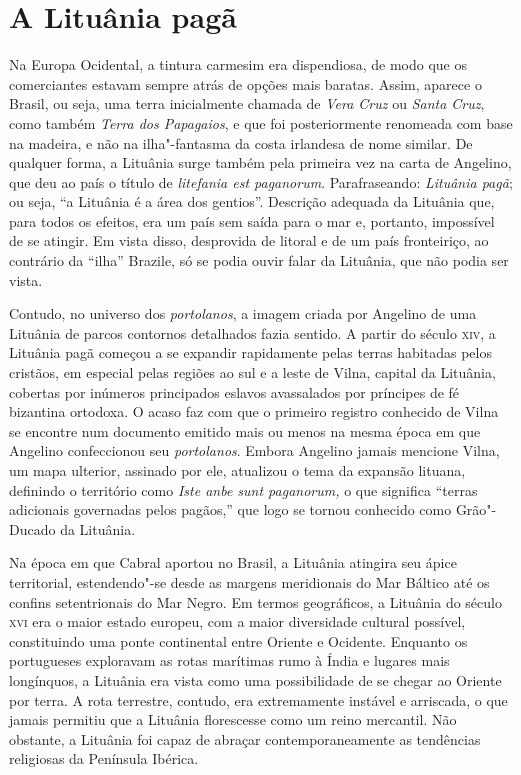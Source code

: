 \section*{A Lituânia pagã}

Na Europa
Ocidental, a tintura carmesim era dispendiosa, de modo que os
comerciantes estavam sempre atrás de opções mais baratas. Assim, aparece
o Brasil, ou seja, uma terra inicialmente chamada de \textit{Vera Cruz} ou
\textit{Santa Cruz}, como também \textit{Terra dos Papagaios}, e que foi
posteriormente renomeada com base na madeira, e não na ilha"-fantasma da
costa irlandesa de nome similar. De qualquer forma, a Lituânia surge
também pela primeira vez na carta de Angelino, que deu ao país o título
de \textit{litefania est paganorum}. Parafraseando: \textit{Lituânia
pagã}; ou seja, ``a Lituânia é a área dos gentios''. Descrição
adequada da Lituânia que, para todos os efeitos, era um país sem saída
para o mar e, portanto, impossível de se atingir. Em vista disso,
desprovida de litoral e de um país fronteiriço, ao contrário da ``ilha''
Brazile, só se podia ouvir falar da Lituânia, que não podia ser vista.

Contudo, no universo dos \textit{portolanos}, a imagem criada por Angelino de uma
Lituânia de parcos contornos detalhados fazia sentido. A partir do
século \textsc{xiv}, a Lituânia pagã começou a se expandir rapidamente pelas
terras habitadas pelos cristãos, em especial pelas regiões ao sul e a
leste de Vilna, capital da Lituânia, cobertas por inúmeros principados
eslavos avassalados por príncipes de fé bizantina ortodoxa. O acaso faz
com que o primeiro registro conhecido de Vilna se encontre num documento
emitido mais ou menos na mesma época em que Angelino confeccionou seu
\textit{portolanos}. Embora Angelino jamais mencione Vilna, um mapa ulterior,
assinado por ele, atualizou o tema da expansão lituana, definindo o
território como \textit{Iste anbe sunt paganorum,} o que significa
``terras adicionais governadas pelos pagãos,'' que logo se tornou
conhecido como Grão"-Ducado da Lituânia. 

Na época em que Cabral aportou
no Brasil, a Lituânia atingira seu ápice territorial, estendendo"-se
desde as margens meridionais do Mar Báltico até os confins setentrionais
do Mar Negro. Em termos geográficos, a Lituânia do século \textsc{xvi} era o maior
estado europeu, com a maior diversidade cultural possível, constituindo
uma ponte continental entre Oriente e Ocidente. Enquanto os portugueses
exploravam as rotas marítimas rumo à Índia e lugares mais longínquos, a
Lituânia era vista como uma possibilidade de se chegar ao Oriente por
terra. A rota terrestre, contudo, era extremamente instável e arriscada,
o que jamais permitiu que a Lituânia florescesse como um reino
mercantil. Não obstante, a Lituânia foi capaz de abraçar
contemporaneamente as tendências religiosas da Península Ibérica.

